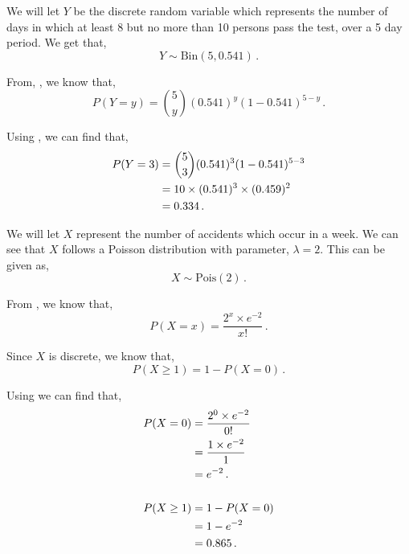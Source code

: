 \begin{subquestions}
\begin{subsubquestions}
\subsubquestion

We will let $Y$ be the discrete random variable which represents the number of days in which at least 8 but no more than 10 persons pass the test, over a 5 day period. We get that,
\begin{equation}
	Y \sim \text{Bin}(5,0.541) \,.
\end{equation}

From, , we know that,
\begin{equation}
	P(Y = y) = { 5 \choose y} (0.541)^y (1-0.541)^{5-y} \,. \label{2009:q4:BinEqn2}
\end{equation}

Using , we can find that,
\begin{align}
	P(Y=3) & = { 5 \choose 3} (0.541)^3 (1-0.541)^{5-3} \nonumber \\
	       & = 10 \times (0.541)^3 \times (0.459)^{2} \nonumber \\
	       & = 0.334 \,.
\end{align}

\end{subsubquestions}

	
\subquestion

We will let $X$ represent the number of accidents which occur in a week. We can see that $X$ follows a Poisson distribution with parameter, $\lambda =2$. This can be given as,
\begin{equation}
	X \sim \text{Pois}(2) \,.
\end{equation}

From , we know that,
\begin{equation}
	P(X = x) =\frac{2^x \times e^{-2}}{x!} \,. \label{2009:q4:PoisEqn1}
\end{equation}

Since $X$ is discrete, we know that,
\begin{equation}
	P(X \geq 1) = 1 - P(X=0) \,.
\end{equation}

Using  we can find that,
\begin{align}
	P(X=0) & = \frac{2^0 \times e^{-2}}{0!} \nonumber \\
	     & = \frac{1 \times e^{-2}}{1} \nonumber \\
	     & = e^{-2} \,. \\ \nonumber \\ 
	 P(X \geq 1) & = 1 - P(X=0) \nonumber \\
	             & = 1 - e^{-2} \nonumber \\
	             & = 0.865 \,.  
\end{align}


\end{subquestions}
